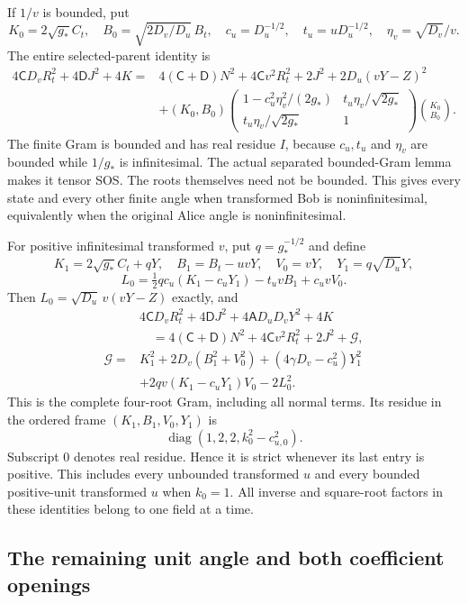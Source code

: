 If $1/v$ is bounded, put
\[
K_0=2\sqrt{g_*}C_t,\quad B_0=\sqrt{2D_v/D_u}\,B_t,
\quad c_u=D_u^{-1/2},\quad t_u=uD_u^{-1/2},\quad
\eta_v=\sqrt{D_v}/v.
\]
The entire selected-parent identity is
\begin{align*}
4\mathsf C D_vR_t^2+4\mathsf D J^2+4K
={}&4(\mathsf C+\mathsf D)N^2+4\mathsf C v^2R_t^2
 +2J^2+2D_u(vY-Z)^2\\
&+(K_0,B_0)
\begin{pmatrix}
1-c_u^2\eta_v^2/(2g_*)&t_u\eta_v/\sqrt{2g_*}\\
t_u\eta_v/\sqrt{2g_*}&1
\end{pmatrix}
\binom{K_0}{B_0}.
\tag{R2O10}
\end{align*}
The finite Gram is bounded and has real residue $I$, because $c_u,t_u$
and $\eta_v$ are bounded while $1/g_*$ is infinitesimal.  The actual
separated bounded-Gram lemma makes it tensor SOS.  The roots themselves
need not be bounded.  This gives every state and every other finite angle
when transformed Bob is noninfinitesimal, equivalently when the original
Alice angle is noninfinitesimal.

For positive infinitesimal transformed $v$, put
$q=g_*^{-1/2}$ and define
\[
K_1=2\sqrt{g_*}C_t+qY,\quad
B_1=B_t-uvY,\quad V_0=vY,\quad Y_1=q\sqrt{D_u}Y,
\]
\[
L_0=\tfrac12q c_u(K_1-c_uY_1)-t_uvB_1+c_uvV_0.
\]
Then $L_0=\sqrt{D_u}\,v(vY-Z)$ exactly, and
\begin{align*}
&4\mathsf C D_vR_t^2+4\mathsf D J^2
       +4\mathsf A D_uD_vY^2+4K\\
&\quad=4(\mathsf C+\mathsf D)N^2+4\mathsf C v^2R_t^2
 +2J^2+\mathcal G,\\
\mathcal G={}&K_1^2+2D_v(B_1^2+V_0^2)
 +(4\gamma D_v-c_u^2)Y_1^2\\
&+2qv(K_1-c_uY_1)V_0-2L_0^2.
\tag{R2O11}
\end{align*}
This is the complete four-root Gram, including all normal terms.  Its
residue in the ordered frame $(K_1,B_1,V_0,Y_1)$ is
\[
\operatorname{diag}(1,2,2,k_0^2-c_{u,0}^2).
\tag{R2O12}
\]
Subscript $0$ denotes real residue.  Hence it is strict whenever its
last entry is positive.  This includes every unbounded transformed
$u$ and every bounded positive-unit transformed $u$ when $k_0=1$.
All inverse and square-root factors in these identities belong to one
field at a time.

\subsection{The remaining unit angle and both coefficient openings}

